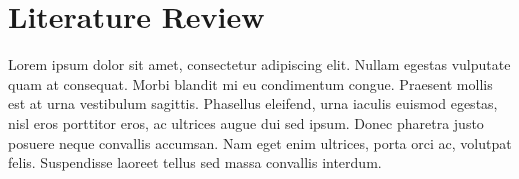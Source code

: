 \documentclass[../thesis.tex]{subfiles}
\begin{document}
\chapter{Literature Review}

Lorem ipsum dolor sit amet, consectetur adipiscing elit. Nullam egestas vulputate quam at consequat. Morbi blandit mi eu condimentum congue. Praesent mollis est at urna vestibulum sagittis. Phasellus eleifend, urna iaculis euismod egestas, nisl eros porttitor eros, ac ultrices augue dui sed ipsum. Donec pharetra justo posuere neque convallis accumsan. Nam eget enim ultrices, porta orci ac, volutpat felis. Suspendisse laoreet tellus sed massa convallis interdum.
\end{document}
